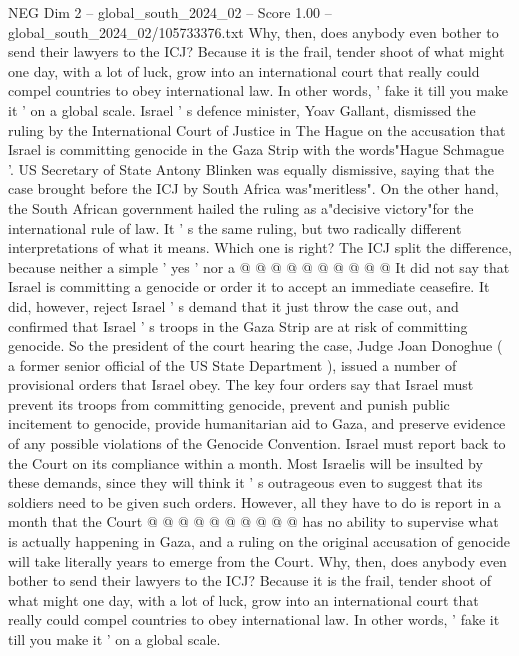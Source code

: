 \begin{textsample}{NEG Dim 2 – global\_south\_2024\_02 – Score 1.00 – global\_south\_2024\_02/105733376.txt}  \label{ex:f2_neg_416}
Why, then, does anybody even bother to send their lawyers to the ICJ?
Because it is the frail, tender shoot of what might one day, with a lot of luck, grow into an international court that really could compel countries to obey international law.
In other words, ' fake it till you make it ' on a global scale.
Israel ' s defence minister, Yoav Gallant, dismissed the ruling by the International Court of Justice in The Hague on the accusation that Israel is committing genocide in the Gaza Strip with the words"Hague Schmague '.
US Secretary of State Antony Blinken was equally dismissive, saying that the case brought before the ICJ by South Africa was"meritless".
On the other hand, the South African government hailed the ruling as a"decisive victory"for the international rule of law.
It ' s the same ruling, but two radically different interpretations of what it means.
Which one is right?
The ICJ split the difference, because neither a simple ' yes ' nor a @ @ @ @ @ @ @ @ @ @ It did not say that Israel is committing a genocide or order it to accept an immediate ceasefire.
It did, however, reject Israel ' s demand that it just throw the case out, and confirmed that Israel ' s troops in the Gaza Strip are at risk of committing genocide.
So the president of the court hearing the case, Judge Joan Donoghue ( a former senior official of the US State Department ), issued a number of provisional orders that Israel obey.
The key four orders say that Israel must prevent its troops from committing genocide, prevent and punish public incitement to genocide, provide humanitarian aid to Gaza, and preserve evidence of any possible violations of the Genocide Convention.
Israel must report back to the Court on its compliance within a month.
Most Israelis will be insulted by these demands, since they will think it ' s outrageous even to suggest that its soldiers need to be given such orders.
However, all they have to do is report in a month that the Court @ @ @ @ @ @ @ @ @ @ has no ability to supervise what is actually happening in Gaza, and a ruling on the original accusation of genocide will take literally years to emerge from the Court.
Why, then, does anybody even bother to send their lawyers to the ICJ?
Because it is the frail, tender shoot of what might one day, with a lot of luck, grow into an international court that really could compel countries to obey international law.
In other words, ' fake it till you make it ' on a global scale.

\end{textsample}
